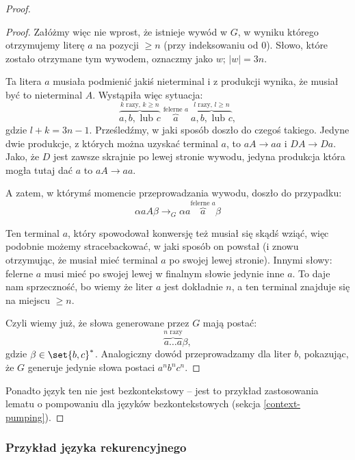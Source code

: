 \begin{proof}
\begin{proof}
        Załóżmy więc nie wprost, że istnieje wywód w \(G\), w wyniku którego otrzymujemy literę \(a\) na pozycji \( \geq n \) (przy indeksowaniu od 0). Słowo, które zostało otrzymane tym wywodem, oznaczmy jako \(w\); \( |w| = 3n\).
        
        Ta litera \( a \) musiała podmienić jakiś nieterminal i z produkcji wynika, że musiał być to nieterminal \(A\). Wystąpiła więc sytuacja:
        \[
            \overbrace{a, b, \text{ lub } c}^{\text{\(k\) razy, \(k \geq n\)}} \; \overbrace{a}^{\text{felerne \(a\)}} \; \overbrace{a, b, \text{ lub } c}^{\text{\(l\) razy, \(l \geq n\)}},
        \]
        gdzie \( l + k = 3n - 1\). Prześledźmy, w jaki sposób doszło do czegoś takiego. Jedyne dwie produkcje, z których można uzyskać terminal \(a\), to \(aA \rightarrow aa\) i \(DA \rightarrow Da\). Jako, że \(D\) jest zawsze skrajnie po lewej stronie wywodu, jedyna produkcja która mogła tutaj dać \(a\) to \(aA \rightarrow aa\).
        
        A zatem, w którymś momencie przeprowadzania wywodu, doszło do przypadku:
        \[
            \alpha a A \beta \rightarrow_G \alpha a \overbrace{a}^{\text{felerne \(a\)}} \beta 
        \]
        
        Ten terminal \(a\), który spowodował konwersję też musiał się skądś wziąć, więc podobnie możemy stracebackować, w jaki sposób on powstał (i znowu otrzymując, że musiał mieć terminal \(a\) po swojej lewej stronie). Innymi słowy: felerne \(a\) musi mieć po swojej lewej w finalnym słowie jedynie inne \(a\). To daje nam sprzeczność, bo wiemy że liter \(a\) jest dokładnie \(n\), a ten terminal znajduje się na miejscu \(\geq n\). 
        
        Czyli wiemy już, że słowa generowane przez \(G\) mają postać:
        \[ 
            \overbrace{a \dots a}^{\text{\(n\) razy}} \beta,
        \]
        gdzie \(\beta \in \set{b, c}^*\). Analogiczny dowód przeprowadzamy dla liter \(b\), pokazując, że \(G\) generuje jedynie słowa postaci \( a^nb^nc^n \).
    \end{proof}
    
    Ponadto język ten nie jest bezkontekstowy -- jest to przykład zastosowania lematu o pompowaniu dla języków bezkontekstowych (sekcja \ref{context-pumping}).
\end{proof}

\subsubsection{Przykład języka rekurencyjnego}
\label{recursive-example}

